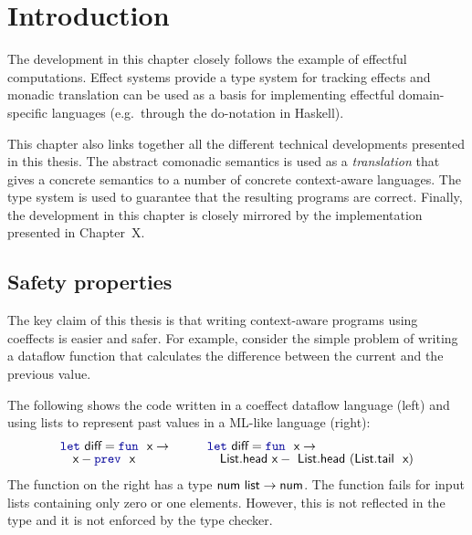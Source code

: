 \documentclass[
		twoside,openright,titlepage,numbers=noenddot,headinclude,%
                footinclude=true,cleardoublepage=empty,
                BCOR=10mm,paper=a4,fontsize=10pt, %
                ngerman,american, %
                ]{scrreprt}
\newcommand{\kvd}[1]{\textnormal{\textcolor{kvdclr}{\ttfamily #1}}}
\newcommand{\ident}[1]{\textnormal{\sffamily #1}}
\begin{document}
\section{Introduction}

The development in this chapter closely follows the example of effectful computations. 
Effect systems provide a type system for tracking effects and monadic translation can be used as 
a basis for implementing effectful domain-specific languages (e.g.~through the do-notation in 
Haskell). 

This chapter also links together all the different technical developments presented in this thesis.
The abstract comonadic semantics is used as a \emph{translation} that gives a concrete semantics
to a number of concrete context-aware languages. The type system is used to guarantee that the
resulting programs are correct. Finally, the development in this chapter is closely mirrored by 
the implementation presented in Chapter~X.

\subsection{Safety properties}
The key claim of this thesis is that writing context-aware programs using coeffects is easier and
safer. For example, consider the simple problem of writing a dataflow function that calculates the 
difference between the current and the previous value. 

The following shows the code written in a coeffect dataflow language (left) and using lists to
represent past values in a ML-like language (right):
%
\begin{equation*}
\begin{array}{l}
\kvd{let}~\ident{diff}=\kvd{fun}~\ident{x}\rightarrow\\[-0.2em]
 \quad \ident{x}-\kvd{prev}~\ident{x}
\end{array} 
\qquad
\begin{array}{l}
\kvd{let}~\ident{diff}=\kvd{fun}~\ident{x}\rightarrow\\[-0.2em]
 \quad \ident{List.head}~\ident{x}-\ident{List.head}~(\ident{List.tail}~\ident{x})
\end{array} 
\end{equation*}
%
The function on the right has a type $\ident{num}~\ident{list}\rightarrow\ident{num}$. The function
fails for input lists containing only zero or one elements. However, this is not reflected in the
type and it is not enforced by the type checker.
\end{document}
